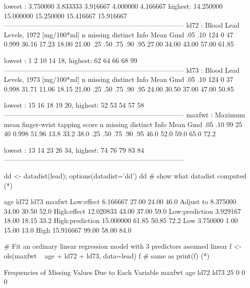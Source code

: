 \begin{Schunk}
\begin{Soutput}
lowest :  3.750000  3.833333  3.916667  4.000000  4.166667
highest: 14.250000 15.000000 15.250000 15.416667 15.916667
--------------------------------------------------------------------------------
ld72 : Blood Lead Levels, 1972 [mg/100*ml] 
       n  missing distinct     Info     Mean      Gmd      .05      .10 
     124        0       47    0.999    36.16    17.23    18.00    21.00 
     .25      .50      .75      .90      .95 
   27.00    34.00    43.00    57.00    61.85 

lowest :  1  2 10 14 18, highest: 62 64 66 68 99
--------------------------------------------------------------------------------
ld73 : Blood Lead Levels, 1973 [mg/100*ml] 
       n  missing distinct     Info     Mean      Gmd      .05      .10 
     124        0       37    0.998    31.71    11.06    18.15    21.00 
     .25      .50      .75      .90      .95 
   24.00    30.50    37.00    47.00    50.85 

lowest : 15 16 18 19 20, highest: 52 53 54 57 58
--------------------------------------------------------------------------------
maxfwt : Maximum mean finger-wrist tapping score 
       n  missing distinct     Info     Mean      Gmd      .05      .10 
      99       25       40    0.998    51.96     13.8     33.2     38.0 
     .25      .50      .75      .90      .95 
    46.0     52.0     59.0     65.0     72.2 

lowest : 13 14 23 26 34, highest: 74 76 79 83 84
--------------------------------------------------------------------------------
\end{Soutput}
\begin{Sinput}
dd <- datadist(lead); options(datadist='dd')
dd    # show what datadist computed (*\ipacue*)
\end{Sinput}
\begin{Soutput}
                      age  ld72  ld73 maxfwt
Low:effect       6.166667 27.00 24.00   46.0
Adjust to        8.375000 34.00 30.50   52.0
High:effect     12.020833 43.00 37.00   59.0
Low:prediction   3.929167 18.00 18.15   33.2
High:prediction 15.000000 61.85 50.85   72.2
Low              3.750000  1.00 15.00   13.0
High            15.916667 99.00 58.00   84.0
\end{Soutput}
\begin{Sinput}
# Fit an ordinary linear regression model with 3 predictors assumed linear
f <- ols(maxfwt ~ age + ld72 + ld73, data=lead)
f         # same as print(f)  (*\ipacue*)
\end{Sinput}
\begin{Soutput}
Frequencies of Missing Values Due to Each Variable
maxfwt    age   ld72   ld73 
    25      0      0      0 


\end{Soutput}
\end{Schunk}
